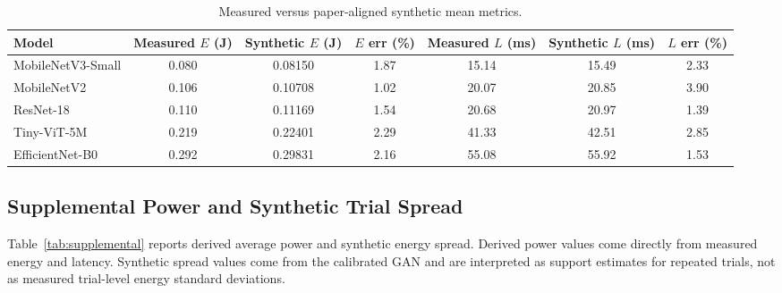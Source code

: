 \documentclass[conference]{IEEEtran}
\begin{document}
\begin{table}[ht]
\centering
\caption{Measured versus paper-aligned synthetic mean metrics.}
\label{tab:alignment}
\begin{tabular}{l
S[table-format=1.3]
S[table-format=1.5]
S[table-format=2.2]
S[table-format=2.2]
S[table-format=2.2]
S[table-format=2.2]}
\toprule
Model &
{Measured $E$ (J)} &
{Synthetic $E$ (J)} &
{$E$ err (\%)} &
{Measured $L$ (ms)} &
{Synthetic $L$ (ms)} &
{$L$ err (\%)} \\
\midrule
MobileNetV3-Small & 0.080 & 0.08150 & 1.87 & 15.14 & 15.49 & 2.33 \\
MobileNetV2 & 0.106 & 0.10708 & 1.02 & 20.07 & 20.85 & 3.90 \\
ResNet-18 & 0.110 & 0.11169 & 1.54 & 20.68 & 20.97 & 1.39 \\
Tiny-ViT-5M & 0.219 & 0.22401 & 2.29 & 41.33 & 42.51 & 2.85 \\
EfficientNet-B0 & 0.292 & 0.29831 & 2.16 & 55.08 & 55.92 & 1.53 \\
\bottomrule
\end{tabular}
\end{table}

\subsection{Supplemental Power and Synthetic Trial Spread}
Table~\ref{tab:supplemental} reports derived average power and synthetic
energy spread. Derived power values come directly from measured energy and
latency. Synthetic spread values come from the calibrated GAN and are
interpreted as support estimates for repeated trials, not as measured
trial-level energy standard deviations.

\begin{table}[ht]
\centering
\caption{Supplemental power and synthetic trial-spread estimates. Model abbreviations match Fig.~\ref{fig:measured-energy}.}
\label{tab:supplemental}
\small
{}
\end{table}
\end{document}
